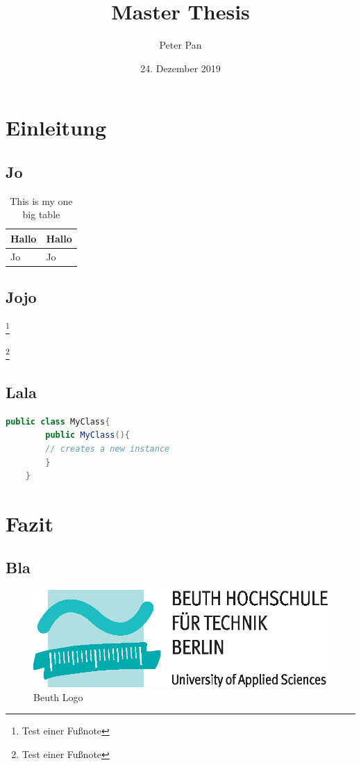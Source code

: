 \documentclass{bht-thesis}
\title{Master Thesis}
\author{Peter Pan}
\date{24. Dezember 2019}
\newcounter{savepage}
\begin{document}
\cleardoublepage
{}
\maketitle
\tableofcontents
\listoffigures
\listoftables
\lstlistoflistings
\cleardoublepage

\onehalfspacing

\chapter{Einleitung}
\section{Jo}
\blindtext[4]

\blindtext[2]
\begin{table}
	\centering
	\begin{tabular}{|l|l|}
		\hline
		Hallo & Hallo \\
		\hline
		Jo & Jo \\
		\hline
	\end{tabular}
	\caption{This is my one big table} \label{tab:sometab}
	\end{table}
\blindtext[3]
\section{Jojo}
\blindtext[2]

\blindtext[3]\footnote{Test einer Fußnote}

\blindtext[5]

\blindtext[1]\footnote{Test einer Fußnote}

\section{Lala}
\blindtext[3]
\begin{lstlisting}[language=Java,float,caption={Nice Java class},label={lst:class}]
	public class MyClass{
		public MyClass(){
		// creates a new instance
		}
	}
\end{lstlisting}
\blindtext[4]
\blindtext[2]
\chapter{Fazit}
\section{Bla}
\blindtext[1]
\begin{figure}
	\includegraphics{figures/Beuth-Logo_basis}
	\centering
	\caption{Beuth Logo}
	\label{fig:bht-logo}
\end{figure}
\blindtext[3]
\blindtext[5]
\end{document}
